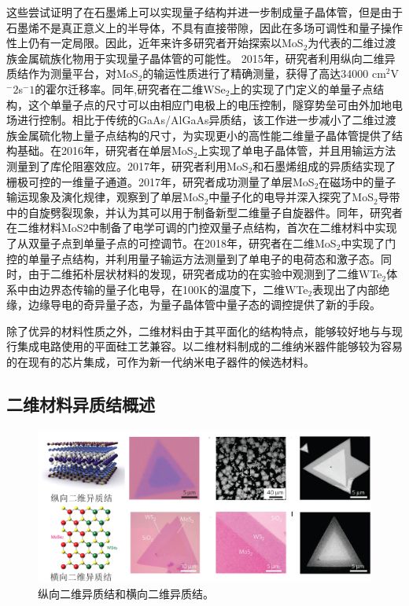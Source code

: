     这些尝试证明了在石墨烯上可以实现量子结构并进一步制成量子晶体管，但是由于石墨烯不是真正意义上的半导体，不具有直接带隙，因此在多场可调性和量子操作性上仍有一定局限。因此，近年来许多研究者开始探索以MoS$_2$为代表的二维过渡族金属硫族化物用于实现量子晶体管的可能性。
    2015年，研究者利用纵向二维异质结作为测量平台，对MoS$_2$的输运性质进行了精确测量，获得了高达34000 cm$^2$V$^-2$s$^-1$的霍尔迁移率。同年,研究者在二维WSe$_2$上的实现了门定义的单量子点结构，这个单量子点的尺寸可以由相应门电极上的电压控制，隧穿势垒可由外加地电场进行控制。相比于传统的GaAs/AlGaAs异质结，该工作进一步减小了二维过渡族金属硫化物上量子点结构的尺寸，为实现更小的高性能二维量子晶体管提供了结构基础。在2016年，研究者在单层MoS$_2$上实现了单电子晶体管，并且用输运方法测量到了库伦阻塞效应。2017年，研究者利用MoS$_2$和石墨烯组成的异质结实现了栅极可控的一维量子通道。2017年，研究者成功测量了单层MoS$_2$在磁场中的量子输运现象及演化规律，观察到了单层MoS$_2$中量子化的电导并深入探究了MoS$_2$导带中的自旋劈裂现象，并认为其可以用于制备新型二维量子自旋器件。同年，研究者在二维材料MoS2中制备了电学可调的门控双量子点结构，首次在二维材料中实现了从双量子点到单量子点的可控调节。在2018年，研究者在二维MoS$_2$中实现了门控的单量子点结构，并利用量子输运方法测量到了单电子的电荷态和激子态。同时，由于二维拓朴层状材料的发现，研究者成功的在实验中观测到了二维WTe$_2$体系中由边界态传输的量子化电导，在100K的温度下，二维WTe$_2$表现出了内部绝缘，边缘导电的奇异量子态，为量子晶体管中量子态的调控提供了新的手段。

    除了优异的材料性质之外，二维材料由于其平面化的结构特点，能够较好地与与现行集成电路使用的平面硅工艺兼容。以二维材料制成的二维纳米器件能够较为容易的在现有的芯片集成，可作为新一代纳米电子器件的候选材料。

\subsection{二维材料异质结概述}

    \begin{figure}[htb]
        \includegraphics{pic/INTRO_heterostructure_VertAndLate.png}
        \caption{纵向二维异质结和横向二维异质结。}
    \end{figure}

